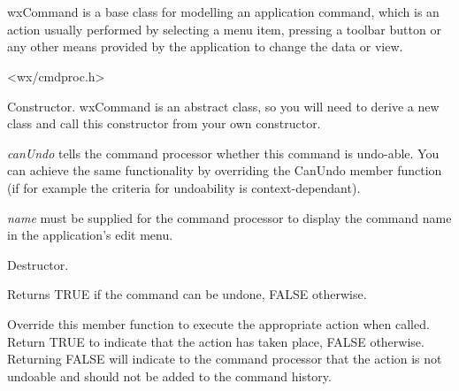 \section{}\label{wxcommand}

wxCommand is a base class for modelling an application command,
which is an action usually performed by selecting a menu item, pressing
a toolbar button or any other means provided by the application to
change the data or view.




<wx/cmdproc.h>






Constructor. wxCommand is an abstract class, so you will need to derive
a new class and call this constructor from your own constructor.

{\it canUndo} tells the command processor whether this command is undo-able. You
can achieve the same functionality by overriding the CanUndo member function (if for example
the criteria for undoability is context-dependant).

{\it name} must be supplied for the command processor to display the command name
in the application's edit menu.



Destructor.



Returns TRUE if the command can be undone, FALSE otherwise.



Override this member function to execute the appropriate action when called.
Return TRUE to indicate that the action has taken place, FALSE otherwise.
Returning FALSE will indicate to the command processor that the action is
not undoable and should not be added to the command history.

